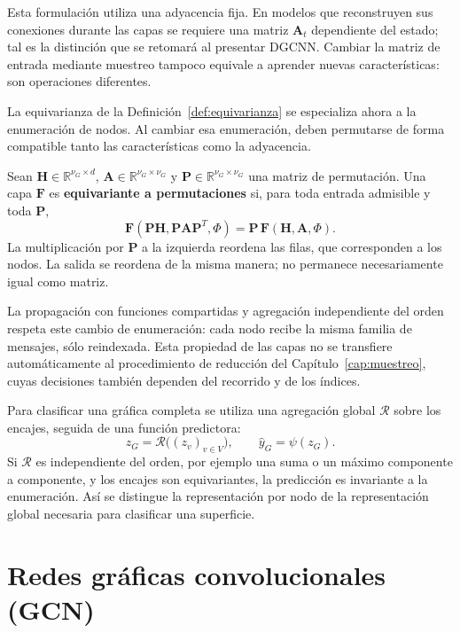 Esta formulación utiliza una adyacencia fija. En modelos que reconstruyen sus conexiones durante las capas se requiere una matriz $\mathbf A_t$ dependiente del estado; tal es la distinción que se retomará al presentar DGCNN. Cambiar la matriz de entrada mediante muestreo tampoco equivale a aprender nuevas características: son operaciones diferentes.

La equivarianza de la Definición~\ref{def:equivarianza} se especializa ahora a la enumeración de nodos. Al cambiar esa enumeración, deben permutarse de forma compatible tanto las características como la adyacencia.

\begin{definition}
\label{def:equivarianza-permutaciones}
Sean $\mathbf H\in\mathbb R^{\nu_G\times d}$, $\mathbf A\in\mathbb R^{\nu_G\times\nu_G}$ y $\mathbf P\in\mathbb R^{\nu_G\times\nu_G}$ una matriz de permutación. Una capa $\mathbf F$ es \textbf{equivariante a permutaciones} si, para toda entrada admisible y toda $\mathbf P$,
\[
\mathbf F(\mathbf P\mathbf H,\mathbf P\mathbf A\mathbf P^T,\Phi)
=\mathbf P\,\mathbf F(\mathbf H,\mathbf A,\Phi).
\]
La multiplicación por $\mathbf P$ a la izquierda reordena las filas, que corresponden a los nodos. La salida se reordena de la misma manera; no permanece necesariamente igual como matriz.
\end{definition}

La propagación con funciones compartidas y agregación independiente del orden respeta este cambio de enumeración: cada nodo recibe la misma familia de mensajes, sólo reindexada. Esta propiedad de las capas no se transfiere automáticamente al procedimiento de reducción del Capítulo~\ref{cap:muestreo}, cuyas decisiones también dependen del recorrido y de los índices.

Para clasificar una gráfica completa se utiliza una agregación global $\mathscr R$ sobre los encajes, seguida de una función predictora:
\[
z_G=\mathscr R\bigl((z_v)_{v\in V}\bigr),\qquad
\hat y_G=\psi(z_G).
\]
Si $\mathscr R$ es independiente del orden, por ejemplo una suma o un máximo componente a componente, y los encajes son equivariantes, la predicción es invariante a la enumeración. Así se distingue la representación por nodo de la representación global necesaria para clasificar una superficie.

\section{Redes gráficas convolucionales (GCN)}

